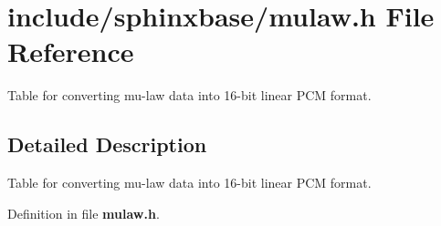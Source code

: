 \section{include/sphinxbase/mulaw.h File Reference}
\label{mulaw_8h}


Table for converting mu-\/law data into 16-\/bit linear P\-C\-M format.  




\subsection{Detailed Description}
Table for converting mu-\/law data into 16-\/bit linear P\-C\-M format. 

Definition in file {\bf mulaw.\-h}.

